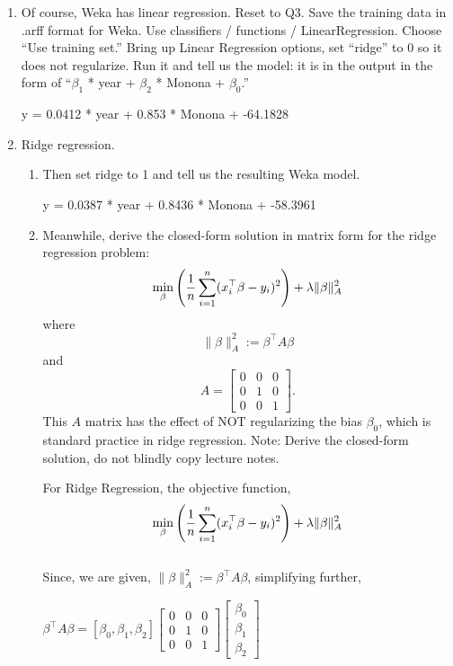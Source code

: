 \documentclass[a4paper]{article}
\theoremstyle{definition}
\newenvironment{soln}{
    \leavevmode\color{blue}\ignorespaces
}{}
\begin{document}
\begin{enumerate}
\item
Of course, Weka has linear regression.  Reset to Q3.  Save the training data in .arff format for Weka.  Use classifiers / functions / LinearRegression.  Choose ``Use training set.''  
  Bring up Linear Regression options, set ``ridge'' to 0 so it does not regularize.  Run it and tell us the model: it is in the output in the form of ``$\beta_1$ * year + $\beta_2$ * Monona + $\beta_0$.'' 


\begin{soln}
y = 0.0412 * year + 0.853  * Monona +  -64.1828
\end{soln}


\item Ridge regression.
\begin{enumerate}
\item
Then set ridge to 1 and tell us the resulting Weka model.

\begin{soln}
y = 0.0387 * year + 0.8436 * Monona + -58.3961
\end{soln}


\item
Meanwhile, derive the closed-form solution in matrix form for the ridge regression problem:
$$\min_\beta \left({1\over n} \sum_{i=1}^n (x_i^\top \beta - y_i)^2 \right) + \lambda \|\beta\|_A^2$$
where 
$$\|\beta\|_A^2 := \beta^\top A \beta$$
and
$$A=
\begin{bmatrix}
0 & 0 & 0 \\
0 & 1 & 0 \\
0 & 0 & 1
\end{bmatrix}.$$
This $A$ matrix has the effect of NOT regularizing the bias $\beta_0$, which is standard practice in ridge regression.
Note: Derive the closed-form solution, do not blindly copy lecture notes.

\begin{soln}
For Ridge Regression, the objective function, $$\min_\beta \left({1\over n} \sum_{i=1}^n (x_i^\top \beta - y_i)^2 \right) + \lambda \|\beta\|_A^2$$\\
Since, we are given, $\|\beta\|_A^2 := \beta^\top A \beta$, simplifying further,

$\beta^\top A \beta = [\beta_0,\beta_1,\beta_2]
\begin{bmatrix}
0 & 0 & 0 \\
0 & 1 & 0 \\
0 & 0 & 1
\end{bmatrix}
\begin{bmatrix}
\beta_0\\
\beta_1\\
\beta_2
\end{bmatrix}
$


\end{soln}
\end{enumerate}
\end{enumerate}
\end{document}
